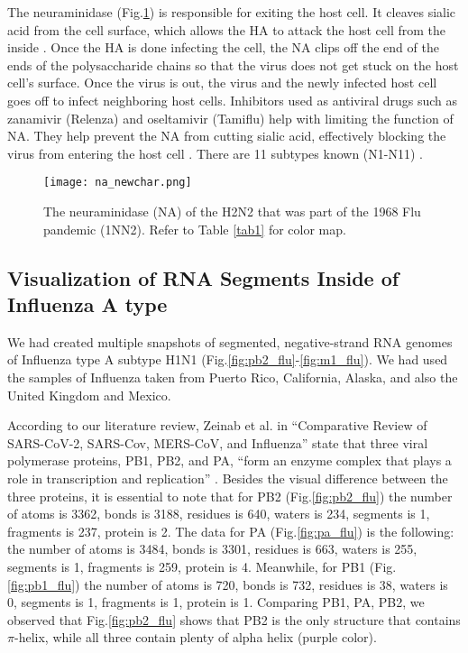 \documentclass[conference]{IEEEtran}
\begin{document}
The neuraminidase (Fig.\ref{fig:na_protein}) is responsible for exiting the host cell. It cleaves sialic acid from the cell surface, which allows the HA to attack the host cell from the inside \citep{Hagen}. Once the HA is done infecting the cell, the NA clips off the end of the ends of the polysaccharide chains so that the virus does not get stuck on the host cell’s surface. \citep{Goodsell} Once the virus is out, the virus and the newly infected host cell goes off to infect neighboring host cells. Inhibitors used as antiviral drugs such as zanamivir (Relenza) and oseltamivir (Tamiflu) help with limiting the function of NA. They help prevent the NA from cutting sialic acid, effectively blocking the virus from entering the host cell \citep{Goodsell}  \citep{Hagen}. There are 11 subtypes known (N1-N11) \citep{CDC}. 

\begin{figure}[htbp]
    \centerline{\texttt{[image: na\_newchar.png]}}
\caption{The neuraminidase (NA) of the H2N2 that was part of the 1968 Flu pandemic (1NN2). Refer to Table \ref{tab1} for color map.}
\label{fig:na_protein}
\end{figure}


\subsection{Visualization of RNA Segments Inside of Influenza A type}
We had created multiple snapshots of segmented, negative-strand RNA genomes of Influenza type A subtype H1N1 (Fig.\ref{fig:pb2_flu}-\ref{fig:m1_flu}). We had used the samples of Influenza taken from Puerto Rico, California, Alaska, and also the United Kingdom and Mexico.

According to our literature review, Zeinab et al. in “Comparative Review of SARS-CoV-2, SARS-Cov, MERS-CoV, and Influenza” state that three viral polymerase proteins, PB1, PB2, and PA, “form an enzyme complex that plays a role in transcription and replication” \citep{Zeinab}. Besides the visual difference between the three proteins, it is essential to note that for PB2 (Fig.\ref{fig:pb2_flu}) the number of atoms is 3362, bonds is 3188, residues is 640, waters is 234, segments is 1, fragments is 237, protein is 2. The data for PA (Fig.\ref{fig:pa_flu}) is the following: the number of atoms is 3484, bonds is 3301, residues is 663, waters is 255, segments is 1, fragments is 259, protein is 4.
Meanwhile, for PB1 (Fig.\ref{fig:pb1_flu}) the number of atoms is 720, bonds is 732, residues is 38, waters is 0, segments is 1, fragments is 1, protein is 1.
Comparing PB1, PA, PB2, we observed that Fig.\ref{fig:pb2_flu} shows that PB2 is the only structure that contains $\pi$-helix, while all three contain plenty of alpha helix (purple color). 
\end{document}
